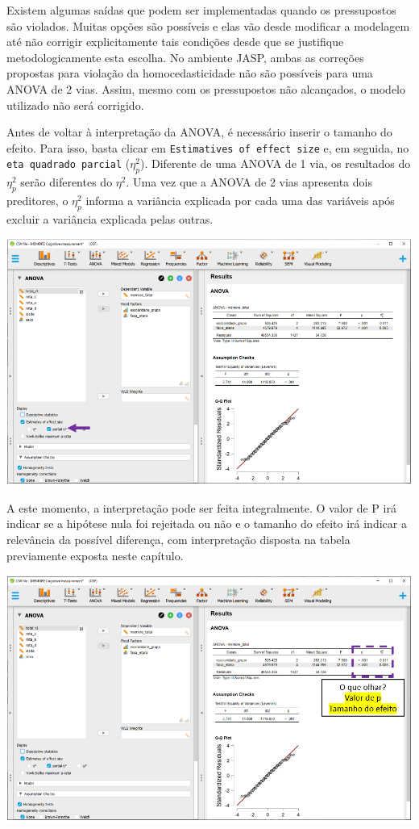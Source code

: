 \documentclass[
]{book}
\begin{document}
Existem algumas saídas que podem ser implementadas quando os
pressupostos são violados. Muitas opções são possíveis e elas vão desde
modificar a modelagem até não corrigir explicitamente tais condições
desde que se justifique metodologicamente esta escolha. No ambiente
JASP, ambas as correções propostas para violação da homocedasticidade
não são possíveis para uma ANOVA de 2 vias. Assim, mesmo com os
pressupostos não alcançados, o modelo utilizado não será corrigido.

Antes de voltar à interpretação da ANOVA, é necessário inserir o tamanho
do efeito. Para isso, basta clicar em
\texttt{Estimatives\ of\ effect\ size} e, em seguida, no
\texttt{eta\ quadrado\ parcial} (\(η_p^2\)). Diferente de uma ANOVA de 1
via, os resultados do \(η_p^2\) serão diferentes do \(η^2\). Uma vez que
a ANOVA de 2 vias apresenta dois preditores, o \(η_p^2\) informa a
variância explicada por cada uma das variáveis após excluir a variância
explicada pelas outras.

\includegraphics{./img/cap_anova_two_way_tamanho_do_efeito.png}

A este momento, a interpretação pode ser feita integralmente. O valor de
P irá indicar se a hipótese nula foi rejeitada ou não e o tamanho do
efeito irá indicar a relevância da possível diferença, com interpretação
disposta na tabela previamente exposta neste capítulo.

\includegraphics{./img/cap_anova_two_way_resultados_finais.png}
\end{document}
